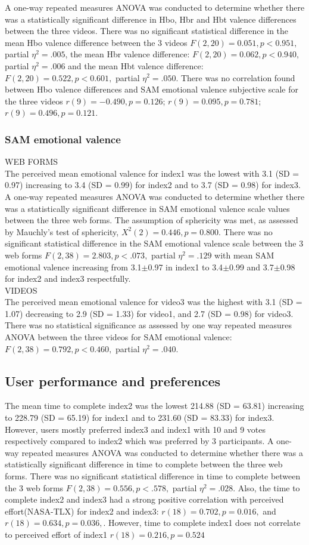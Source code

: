 \documentclass[a4paper]{report}
\begin{document}
				A one-way repeated measures ANOVA was conducted to determine whether there was a statistically significant difference in Hbo, Hbr and Hbt valence differences between the three videos. There was no significant statistical difference in the mean Hbo valence difference between the 3 videos $F(2,20)=0.051, p<0.951,$ partial $\eta^{2}=.005$, the mean Hbr valence difference: $F(2,20)=0.062, p<0.940,$ partial $\eta^{2}=.006$ and the mean Hbt valence difference: $F(2,20)=0.522, p<0.601,$ partial $\eta^{2}=.050$.
				There was no correlation found between Hbo valence differences and SAM emotional valence subjective scale for the three videos $r(9)=-0.490, p=0.126$; $r(9)=0.095, p=0.781$; $r(9)=0.496, p=0.121$. 
			\subsubsection{SAM emotional valence}
			WEB FORMS\\
				The perceived mean emotional valence for index1 was the lowest with 
				3.1 (SD = 0.97) increasing to 3.4 (SD = 0.99) for index2 and to 3.7 (SD = 0.98) for index3.
				A one-way repeated measures ANOVA was conducted to determine whether there was a statistically significant difference in SAM emotional valence scale values between the three web forms. The assumption of sphericity was met, as assessed by Mauchly's test of sphericity, $X^{2}(2) = 0.446, p = 0.800$. There was no significant statistical difference in the SAM emotional valence scale between the 3 web forms  $F(2,38)=2.803, p<.073,$ partial $\eta^{2}=.129$ with mean SAM emotional valence increasing from 3.1$\pm$0.97 in index1 to 3.4$\pm$0.99 and 3.7$\pm$0.98 for index2 and index3 respectfully.\\
			VIDEOS\\
				The perceived mean emotional valence for video3 was the highest with 3.1 (SD = 1.07) decreasing to 2.9 (SD = 1.33) for video1, and 2.7 (SD = 0.98) for video3. There was no statistical significance as assessed by one way repeated measures ANOVA between the three videos for SAM emotional valence: $F(2,38)=0.792, p<0.460,$ partial $\eta^{2}=.040$.
		\subsection{User performance and preferences}
		The mean time to complete index2 was the lowest 214.88 (SD = 63.81) increasing to 228.79 (SD = 65.19) for index1 and to 231.60 (SD = 83.33) for index3. However, users mostly preferred index3 and index1 with 10 and 9 votes respectively compared to index2 which was preferred by 3 participants.  
		A one-way repeated measures ANOVA was conducted to determine whether there was a statistically significant difference in time to complete between the three web forms. There was no significant statistical difference in time to complete between the 3 web forms  $F(2,38)=0.556, p<.578,$ partial $\eta^{2}=.028$. 
		Also, the time to complete index2 and index3 had a strong positive correlation with perceived effort(NASA-TLX) for index2 and index3: $r(18)=0.702, p=0.016,$ and $r(18)=0.634, p=0.036,$. However, time to complete index1 does not correlate to perceived effort of index1 $r(18)=0.216, p=0.524$
\end{document}

